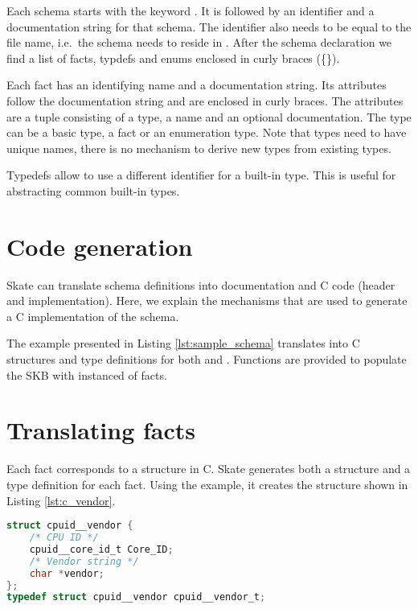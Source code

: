 \documentclass[a4paper,11pt,twoside]{report}
\begin{document}
{{Each schema starts with the keyword . It is followed by an
identifier and a documentation string for that schema. The identifier also needs
to be equal to the file name, i.e.~the schema  needs to reside in
. After the schema declaration we find a list of facts,
typdefs and enums enclosed in curly braces (\{\}).

Each fact has an identifying name and a documentation string. Its attributes
follow the documentation string and are enclosed in curly braces. The attributes
are a tuple consisting of a type, a name and an optional documentation. The type
can be a basic type, a fact or an enumeration type. Note that types need to have
unique names, there is no mechanism to derive new types from existing types.

Typedefs allow to use a different identifier for a built-in type. This is useful
for abstracting common built-in types.


\section{Code generation}

Skate can translate schema definitions into documentation and C code (header
and implementation). Here, we explain the mechanisms that are used to generate a
C implementation of the schema.

The example presented in Listing \ref{lst:sample_schema} translates into C
structures and type definitions for both  and
. Functions are provided to populate the SKB with instanced of
facts.

\section{Translating facts}

Each fact corresponds to a structure in C. Skate generates both a structure
and a type definition for each fact. Using the example, it creates the
structure shown in Listing \ref{lst:c_vendor}.

\begin{lstlisting}[caption={C header for fact
\varname{vendor}},label={lst:c_vendor},language=C]
struct cpuid__vendor {
    /* CPU ID */
    cpuid__core_id_t Core_ID;
    /* Vendor string */
    char *vendor;
};
typedef struct cpuid__vendor cpuid__vendor_t;
\end{lstlisting}

}}
\end{document}
